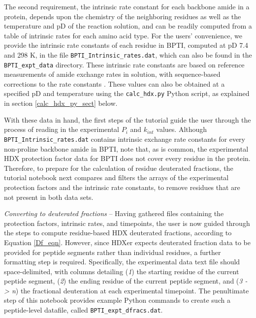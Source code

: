 \documentclass[9pt,tutorial]{livecoms}
\begin{document}
The second requirement, the intrinsic rate constant for each backbone amide in a protein, depends upon the chemistry of the neighboring residues as well as the temperature and pD of the reaction solution, and can be readily computed from a table of intrinsic rates for each amino acid type.
For the users' convenience, we provide the intrinsic rate constants of each residue in BPTI, computed at pD 7.4 and 298 K, in the file \texttt{BPTI\_Intrinsic\_rates.dat}, which can also be found in the \texttt{BPTI\_expt\_data} directory.
These intrinsic rate constants are based on reference measurements of amide exchange rates in solution, with sequence-based corrections to the rate constants \cite{Bai1993, Nguyen2018}.
These values can also be obtained at a specified pD and temperature using the \texttt{calc\_hdx.py} Python script, as explained in section \ref{calc_hdx_py_sect} below.

With these data in hand, the first steps of the tutorial guide the user through the process of reading in the experimental $P_i$ and $k_{int}$ values.
Although \texttt{BPTI\_Intrinsic\_rates.dat} contains intrinsic exchange rate constants for every non-proline backbone amide in BPTI, note that, as is common, the experimental HDX protection factor data for BPTI does not cover every residue in the protein. 
Therefore, to prepare for the calculation of residue deuterated fractions, the tutorial notebook next compares and filters the arrays of the experimental protection factors and the intrinsic rate constants, to remove residues that are not present in both data sets.

\noindent
\textit{Converting to deuterated fractions} -- Having gathered files containing the protection factors, intrinsic rates, and timepoints, the user is now guided through the steps to compute residue-based HDX deuterated fractions, according to Equation \ref{Df_eqn}.
However, since HDXer expects deuterated fraction data to be provided for peptide segments rather than individual residues, a further formatting step is required.
Specifically, the experimental data text file should space-delimited, with columns detailing (\textit{1}) the starting residue of the current peptide segment, (\textit{2}) the ending residue of the current peptide segment, and (\textit{3 -> n}) the fractional deuteration at each experimental timepoint.
The penultimate step of this notebook provides example Python commands to create such a peptide-level datafile, called \texttt{BPTI\_expt\_dfracs.dat}.
\end{document}

